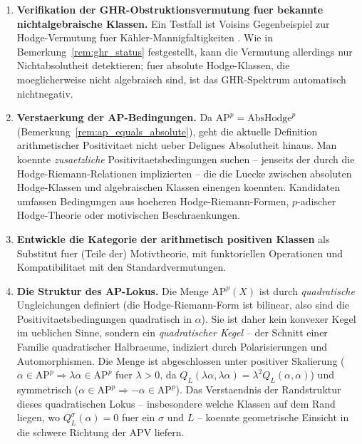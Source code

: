\documentclass[aps,prd,twocolumn,superscriptaddress,nofootinbib]{revtex4-2}
\theoremstyle{definition}
\theoremstyle{remark}
\begin{document}
\begin{enumerate}
\item \textbf{Verifikation der GHR-Obstruktionsvermutung fuer bekannte nichtalgebraische Klassen.} Ein Testfall ist Voisins Gegenbeispiel zur Hodge-Vermutung fuer K\"ahler-Mannigfaltigkeiten \cite{Voisin2002b}. Wie in Bemerkung~\ref{rem:ghr_status} festgestellt, kann die Vermutung allerdings nur Nichtabsolutheit detektieren; fuer absolute Hodge-Klassen, die moeglicherweise nicht algebraisch sind, ist das GHR-Spektrum automatisch nichtnegativ.

\item \textbf{Verstaerkung der AP-Bedingungen.} Da $\mathrm{AP}^p = \mathrm{AbsHodge}^p$ (Bemerkung~\ref{rem:ap_equals_absolute}), geht die aktuelle Definition arithmetischer Positivitaet nicht ueber Delignes Absolutheit hinaus. Man koennte \textit{zusaetzliche} Positivitaetsbedingungen suchen -- jenseits der durch die Hodge-Riemann-Relationen implizierten -- die die Luecke zwischen absoluten Hodge-Klassen und algebraischen Klassen einengen koennten. Kandidaten umfassen Bedingungen aus hoeheren Hodge-Riemann-Formen, $p$-adischer Hodge-Theorie oder motivischen Beschraenkungen.

\item \textbf{Entwickle die Kategorie der arithmetisch positiven Klassen} als Substitut fuer (Teile der) Motivtheorie, mit funktoriellen Operationen und Kompatibilitaet mit den Standardvermutungen.

\item \textbf{Die Struktur des AP-Lokus.} Die Menge $\mathrm{AP}^p(X)$ ist durch \emph{quadratische} Ungleichungen definiert (die Hodge-Riemann-Form ist bilinear, also sind die Positivitaetsbedingungen quadratisch in $\alpha$). Sie ist daher kein konvexer Kegel im ueblichen Sinne, sondern ein \emph{quadratischer Kegel} -- der Schnitt einer Familie quadratischer Halbraeume, indiziert durch Polarisierungen und Automorphismen. Die Menge ist abgeschlossen unter positiver Skalierung ($\alpha \in \mathrm{AP}^p \Rightarrow \lambda\alpha \in \mathrm{AP}^p$ fuer $\lambda > 0$, da $Q_L(\lambda\alpha, \lambda\alpha) = \lambda^2 Q_L(\alpha, \alpha)$) und symmetrisch ($\alpha \in \mathrm{AP}^p \Rightarrow -\alpha \in \mathrm{AP}^p$). Das Verstaendnis der Randstruktur dieses quadratischen Lokus -- insbesondere welche Klassen auf dem Rand liegen, wo $Q_L^\sigma(\alpha) = 0$ fuer ein $\sigma$ und $L$ -- koennte geometrische Einsicht in die schwere Richtung der APV liefern.
\end{enumerate}
\end{document}
